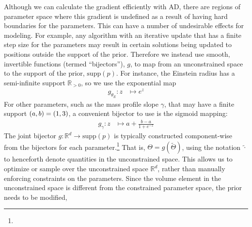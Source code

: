 Although we can calculate the gradient efficiently with AD, there are regions of parameter space where this gradient is undefined as a result of having hard boundaries for the parameters. This can have a number of undesirable effects for modeling. 
For example, any algorithm with an iterative update that has a finite step size for the parameters may result in certain solutions being updated to positions outside the support of the prior. %
Therefore we instead use smooth, invertible functions (termed ``bijectors''), $g$, to map from an unconstrained space to the support of the prior, $\text{supp}(p)$. 
For instance, the Einstein radius has a semi-infinite support $\mathbb{R}_{>0}$, so we use the exponential map
\begin{equation}
\begin{split}\label{eqn:exp}
    g_{\theta_E}: %
    z &\mapsto e^z
\end{split}
\end{equation}
For other parameters, such as the mass profile slope $\gamma$, that may have a finite support $\qty(a,b)=(1,3)$, 
a convenient bijector to use is the sigmoid mapping:
\begin{equation}\label{eqn:sigmoid}
\begin{split}
    g_\gamma: %
    z &\mapsto a + \frac{b-a}{1+e^{-z}}
\end{split}
\end{equation}
The joint bijector $g: \mathbb{R}^d \rightarrow \text{supp}(p)$ is typically constructed component-wise from the bijectors for each parameter.\footnote{} That is, $\Theta=g(\tilde{\Theta})$, 
using the notation $\tilde{\cdot}$ to henceforth denote quantities in the unconstrained space.
This allows us to optimize or sample over the unconstrained space $\mathbb{R}^d$, rather than manually enforcing constraints on the parameters. 
Since the volume element in the unconstrained space is different from the constrained parameter space, the prior needs to be modified,
